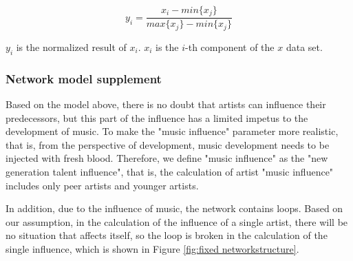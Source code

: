 \documentclass[12pt]{article}  %
\begin{document}
%
\begin{equation}\label{eq:standard formula}
    y_i=\frac{x_i-min\{x_j\}}{max\{x_j\}-min\{x_j\}}
\end{equation}

$y_i$ is the normalized result of $x_i$. $x_i$ is the $i$-th component of the $x$ data set. 

\subsubsection{Network model supplement }

Based on the model above, there is no doubt that artists can influence their predecessors, but this part of the influence has a limited impetus to the development of music. To make the "music influence" parameter more realistic, that is, from the perspective of development, music development needs to be injected with fresh blood. Therefore, we define "music influence" as the "new generation talent influence", that is, the calculation of artist "music influence" includes only peer artists and younger artists. \par

In addition, due to the influence of music, the network contains loops. Based on our assumption, in the calculation of the influence of a single artist, there will be no situation that affects itself, so the loop is broken in the calculation of the single influence, which is shown in Figure \ref{fig:fixed networkstructure}. 
\end{document}
